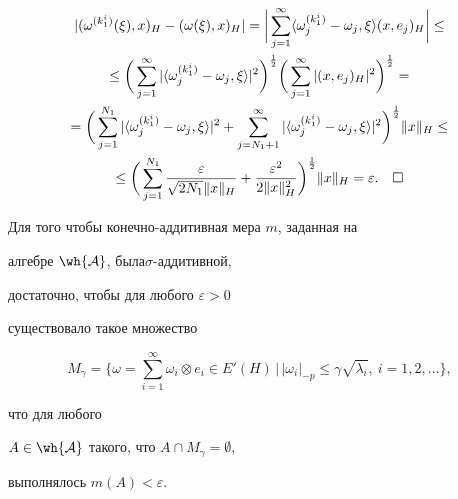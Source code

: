 \begin{multline*}


|(\omega^{(k_1^i)}(\xi),x)_H-(\omega(\xi),x)_H |=


\bigg|\sum_{j=1}^{\infty}\la \omega_j^{(k_1^i)}-\omega_j,


\xi\ra (x,e_j)_H \bigg|\leq \\


%


\leq \bigg(\sum_{j=1}^{\infty}|\la \omega_j^{(k_1^i)}-\omega_j,


\xi\ra |^2\bigg)^{\frac{1}{2}}


\bigg(\sum_{j=1}^{\infty}|(x,e_j)_H|^2\bigg)^{\frac{1}{2}}= \\


%


= \bigg(\sum_{j=1}^{N_1}|\la \omega_j^{(k_1^i)}-\omega_j,\xi\ra |^2


+\sum_{j=N_1+1}^{\infty}|\la \omega_j^{(k_1^i)}-\omega_j,


\xi\ra |^2\bigg)^{\frac{1}{2}}\|x\|_H\leq \\


%


\le\bigg(\sum_{j=1}^{N_1} \frac{\varepsilon}{\sqrt{2N_1}\|x\|_H}+


\frac{\varepsilon^2}{2\|x\|_H^2}\bigg)^{\frac{1}{2}}\|x\|_H=\varepsilon.


\quad\square


\end{multline*}








\begin{lem}


Для того чтобы конечно-аддитивная мера $m$, заданная на


алгебре $\wh{\cal{A}}$, была\linebreak $\sigma$-аддитивной,


достаточно, чтобы для любого $\varepsilon>0$


существовало такое множество


$$


M_\gamma= \bigg\{\omega=\sum\limits_{i=1}^{\infty}\omega_i\otimes e_i\in


E'(H)\,\Big |\, |\omega_i|_{-p}\leq\gamma\sqrt{\lambda_i},


\ i=1,2,\dotsc\bigg \},


$$


что для любого


$A\in\wh{\cal{A}}$ такого, что $A\cap M_{\gamma}=\emptyset$,


выполнялось $m(A)<\varepsilon$.


\end{lem}





